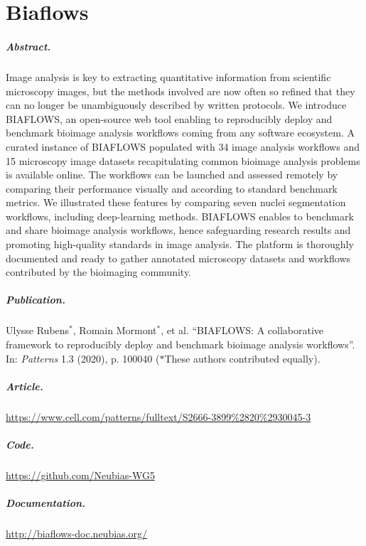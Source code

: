 \chapter{Biaflows}
\label{app:biaflows}

\paragraph{Abstract.} Image analysis is key to extracting quantitative information from scientific microscopy images, but the methods involved are now often so refined that they can no longer be unambiguously described by written protocols. We introduce BIAFLOWS, an open-source web tool enabling to reproducibly deploy and benchmark bioimage analysis workflows coming from any software ecosystem. A curated instance of BIAFLOWS populated with 34 image analysis workflows and 15 microscopy image datasets recapitulating common bioimage analysis problems is available online. The workflows can be launched and assessed remotely by comparing their performance visually and according to standard benchmark metrics. We illustrated these features by comparing seven nuclei segmentation workflows, including deep-learning methods. BIAFLOWS enables to benchmark and share bioimage analysis workflows, hence safeguarding research results and promoting high-quality standards in image analysis. The platform is thoroughly documented and ready to gather annotated microscopy datasets and workflows contributed by the bioimaging community.

\paragraph{Publication.} Ulysse Rubens$^\ast$, Romain Mormont$^\ast$, et al. ``BIAFLOWS: A collaborative framework to reproducibly deploy and benchmark bioimage analysis workflows''. In: \textit{Patterns}  1.3 (2020), p. 100040 ($\ast$These authors contributed equally).

\paragraph{Article.} \url{https://www.cell.com/patterns/fulltext/S2666-3899%2820%2930045-3}

\paragraph{Code.} \url{https://github.com/Neubias-WG5}

\paragraph{Documentation.} \url{http://biaflows-doc.neubias.org/}
